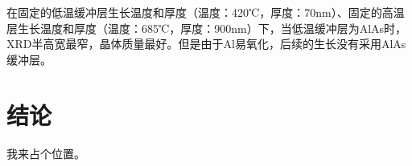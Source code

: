 在固定的低温缓冲层生长温度和厚度（温度：420℃，厚度：70nm）、固定的高温层生长温度和厚度（温度：685℃，厚度：900nm）下，当低温缓冲层为AlAs时，XRD半高宽最窄，晶体质量最好。但是由于Al易氧化，后续的生长没有采用AlAs缓冲层。

\section{结论}

我来占个位置。\cite{BUPT_Thesis_Format_2004}

\ifx\usechapbib\empty


\fi

